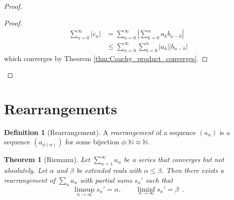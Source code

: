 \documentclass{book}
\newtheorem{thm}[prop]{Theorem}
\theoremstyle{definition}
\newtheorem{df}[prop]{Definition}
\begin{document}
\begin{proof}
\pf
{}
\begin{proof}
	\pf
	\begin{align*}
		\sum_{n=0}^\infty |c_n| & = \sum_{n=0}^\infty \left| \sum_{k=0}^n a_k b_{n-k} \right| \\
		& \leq \sum_{n=0}^\infty \sum_{k=0}^n |a_k| |b_{n-k}|
	\end{align*}
	which converges by Theorem \ref{thm:Cauchy_product_converges}.
\end{proof}
\end{proof}

\section{Rearrangements}

\begin{df}[Rearrangement]
A \emph{rearrangement} of a sequence $(a_n)$ is a sequence $(a_{\phi(n)})$ for some bijection $\phi : \mathbb{N} \approx \mathbb{N}$.
\end{df}

\begin{thm}[Riemann]
Let $\sum_{n=1}^\infty a_n$ be a series that converges but not absolutely. Let $\alpha$ and $\beta$ be extended reals with $\alpha \leq \beta$. Then there exists a rearrangement of $\sum_n a_n$ with partial sums $s_n'$ such that
\[ \limsup_{n \rightarrow \infty} s_n' = \alpha, \qquad \liminf_{n \rightarrow \infty} s_n' = \beta \enspace . \]
\end{thm}
\end{document}
